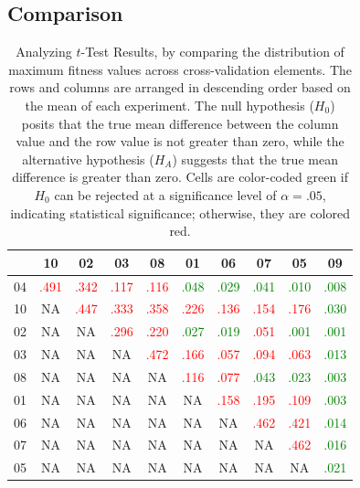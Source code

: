 \documentclass[sigchi,screen]{acmart}
\begin{document}
\subsection{Comparison}
\begin{table}[h]
\begin{tabular}{c|*{9}{c}}
 &  10 & 02 & 03 & 08 & 01 & 06 & 07 & 05 & 09 \\
\hline
04 &  \textcolor{red}{.491} & \textcolor{red}{.342} & \textcolor{red}{.117} & \textcolor{red}{.116} & \textcolor{green}{.048} & \textcolor{green}{.029} & \textcolor{green}{.041} & \textcolor{green}{.010} & \textcolor{green}{.008} \\
10 &  NA & \textcolor{red}{.447} & \textcolor{red}{.333} & \textcolor{red}{.358} & \textcolor{red}{.226} & \textcolor{red}{.136} & \textcolor{red}{.154} & \textcolor{red}{.176} & \textcolor{green}{.030} \\
02 &  NA & NA & \textcolor{red}{.296} & \textcolor{red}{.220} & \textcolor{green}{.027} & \textcolor{green}{.019} & \textcolor{red}{.051} & \textcolor{green}{.001} & \textcolor{green}{.001} \\
03 &  NA & NA & NA & \textcolor{red}{.472} & \textcolor{red}{.166} & \textcolor{red}{.057} & \textcolor{red}{.094} & \textcolor{red}{.063} & \textcolor{green}{.013} \\
08 &  NA & NA & NA & NA & \textcolor{red}{.116} & \textcolor{red}{.077} & \textcolor{green}{.043} & \textcolor{green}{.023} & \textcolor{green}{.003} \\
01 &  NA & NA & NA & NA & NA & \textcolor{red}{.158} & \textcolor{red}{.195} & \textcolor{red}{.109} & \textcolor{green}{.003} \\
06 &  NA & NA & NA & NA & NA & NA & \textcolor{red}{.462} & \textcolor{red}{.421} & \textcolor{green}{.014} \\
07 &  NA & NA & NA & NA & NA & NA & NA & \textcolor{red}{.462} & \textcolor{green}{.016} \\
05 &  NA & NA & NA & NA & NA & NA & NA & NA & \textcolor{green}{.021} \\
\end{tabular}

\caption{Analyzing $t$-Test Results, by comparing the distribution of maximum fitness values across cross-validation elements. The rows and columns are arranged in descending order based on the mean of each experiment. The null hypothesis ($H_0$) posits that the true mean difference between the column value and the row value is not greater than zero, while the alternative hypothesis ($H_A$) suggests that the true mean difference is greater than zero. Cells are color-coded green if $H_0$ can be rejected at a significance level of $\alpha = .05$, indicating statistical significance; otherwise, they are colored red.}
\label{tbl:result-comparison}
\end{table}
\end{document}

